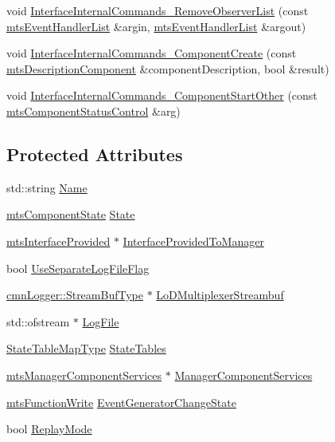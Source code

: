 \begin{DoxyCompactItemize}
\item 
void \hyperlink{classmts_component_a74c3b5c8d362b85ed84f36798aac7207}{Interface\-Internal\-Commands\-\_\-\-Remove\-Observer\-List} (const \hyperlink{classmts_event_handler_list}{mts\-Event\-Handler\-List} \&argin, \hyperlink{classmts_event_handler_list}{mts\-Event\-Handler\-List} \&argout)
\item 
void \hyperlink{classmts_component_a93427d2a73f3d1c2f965837a6eedc46d}{Interface\-Internal\-Commands\-\_\-\-Component\-Create} (const \hyperlink{classmts_description_component}{mts\-Description\-Component} \&component\-Description, bool \&result)
\item 
void \hyperlink{classmts_component_a1df33090eed7cbc805482227a46fa365}{Interface\-Internal\-Commands\-\_\-\-Component\-Start\-Other} (const \hyperlink{classmts_component_status_control}{mts\-Component\-Status\-Control} \&arg)
\end{DoxyCompactItemize}
\subsection*{Protected Attributes}
\begin{DoxyCompactItemize}
\item 
std\-::string \hyperlink{classmts_component_a506cd73bf8afc8286ddf8d933b1b1658}{Name}
\item 
\hyperlink{classmts_component_state}{mts\-Component\-State} \hyperlink{classmts_component_ac5352257c71985bc22cfa81e87f7f445}{State}
\item 
\hyperlink{classmts_interface_provided}{mts\-Interface\-Provided} $\ast$ \hyperlink{classmts_component_a6f9323d126ef72b6c3803abe4864b759}{Interface\-Provided\-To\-Manager}
\item 
bool \hyperlink{classmts_component_a12390c92b351b911b723158e636a9e5a}{Use\-Separate\-Log\-File\-Flag}
\item 
\hyperlink{classcmn_logger_a7d192777882d1dc6bb48ceac0b4e65bb}{cmn\-Logger\-::\-Stream\-Buf\-Type} $\ast$ \hyperlink{classmts_component_a870d5405720c2b9fc95223a1723712fd}{Lo\-D\-Multiplexer\-Streambuf}
\item 
std\-::ofstream $\ast$ \hyperlink{classmts_component_a5174cc0d7c4802fb479c0d065b79052f}{Log\-File}
\item 
\hyperlink{classmts_component_afd25509fe46d10ebc7a53347aa21c4ec}{State\-Table\-Map\-Type} \hyperlink{classmts_component_abe07b3be754d3f14a8454b21f160b537}{State\-Tables}
\item 
\hyperlink{classmts_manager_component_services}{mts\-Manager\-Component\-Services} $\ast$ \hyperlink{classmts_component_ae405a53b19cda763738c768fc2e6d5b9}{Manager\-Component\-Services}
\item 
\hyperlink{classmts_function_write}{mts\-Function\-Write} \hyperlink{classmts_component_ab7019fec5126701863a90ce46c9617f9}{Event\-Generator\-Change\-State}
\item 
bool \hyperlink{classmts_component_a1415d1093295a997b52d7c9d026fb5cc}{Replay\-Mode}
\end{DoxyCompactItemize}
